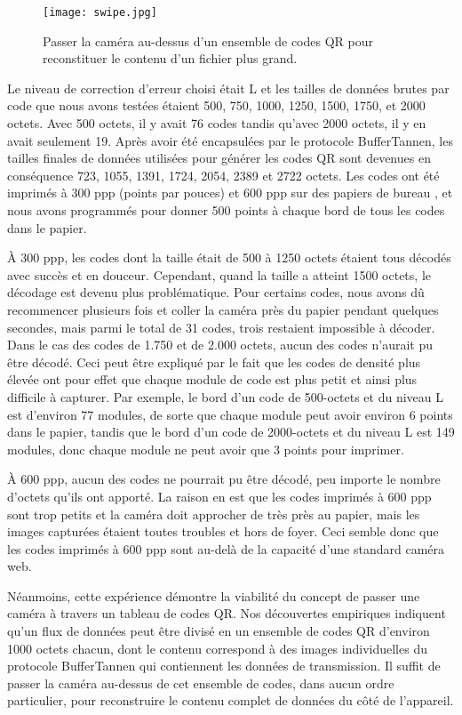 \begin{figure}
\centering
\texttt{[image: swipe.jpg]}
\caption{Passer la caméra au-dessus d'un ensemble de codes QR pour reconstituer le contenu d'un fichier plus grand.}
\label{fig:qr:paper-swipe}
\end{figure}

Le niveau de correction d'erreur choisi était L et les tailles de données brutes par code que nous avons testées étaient 500, 750, 1000, 1250, 1500, 1750, et 2000 octets. Avec 500 octets, il y avait 76 codes tandis qu'avec 2000 octets, il y en avait seulement 19. Après avoir été encapsulées par le protocole BufferTannen, les tailles finales de données utilisées pour générer les codes QR sont devenues en conséquence 723, 1055, 1391, 1724, 2054, 2389 et 2722 octets. Les codes ont été imprimés à 300 ppp (points par pouces) et 600 ppp sur des papiers de bureau , et nous avons programmés pour donner 500 points à chaque bord de tous les codes dans le papier.

À 300 ppp, les codes dont la taille était de 500 à 1250 octets étaient tous décodés avec succès et en douceur. Cependant, quand la taille a atteint 1500 octets, le décodage est devenu plus problématique. Pour certains codes, nous avons dû recommencer plusieurs fois et coller la caméra près du papier pendant quelques secondes, mais parmi le total de 31 codes, trois restaient impossible à décoder. Dans le cas des codes de 1.750 et de 2.000 octets, aucun des codes n'aurait pu être décodé. Ceci peut être expliqué par le fait que les codes de densité plus élevée ont pour effet que chaque module de code est plus petit et ainsi plus difficile à capturer. Par exemple, le bord d'un code de 500-octets et du niveau L est d'environ 77 modules, de sorte que chaque module peut avoir environ 6 points dans le papier, tandis que le bord d'un code de 2000-octets et du niveau L est 149 modules, donc chaque module ne peut avoir que 3 points pour imprimer.

À 600 ppp, aucun des codes ne pourrait pu être décodé, peu importe le nombre d'octets qu'ils ont apporté. La raison en est que les codes imprimés à 600 ppp sont trop petits et la caméra doit approcher de très près au papier, mais les images capturées étaient toutes troubles et hors de foyer. Ceci semble donc que les codes imprimés à 600 ppp sont au-delà de la capacité d'une standard caméra web.

Néanmoins, cette expérience démontre la viabilité du concept de passer une caméra à travers un tableau de codes QR. Nos découvertes empiriques indiquent qu'un flux de données peut être divisé en un ensemble de codes QR d'environ 1000 octets chacun, dont le contenu correspond à des images individuelles du protocole BufferTannen qui contiennent les données de transmission. Il suffit de passer la caméra au-dessus de cet ensemble de codes, dans aucun ordre particulier, pour reconstruire le contenu complet de données du côté de l'appareil.

